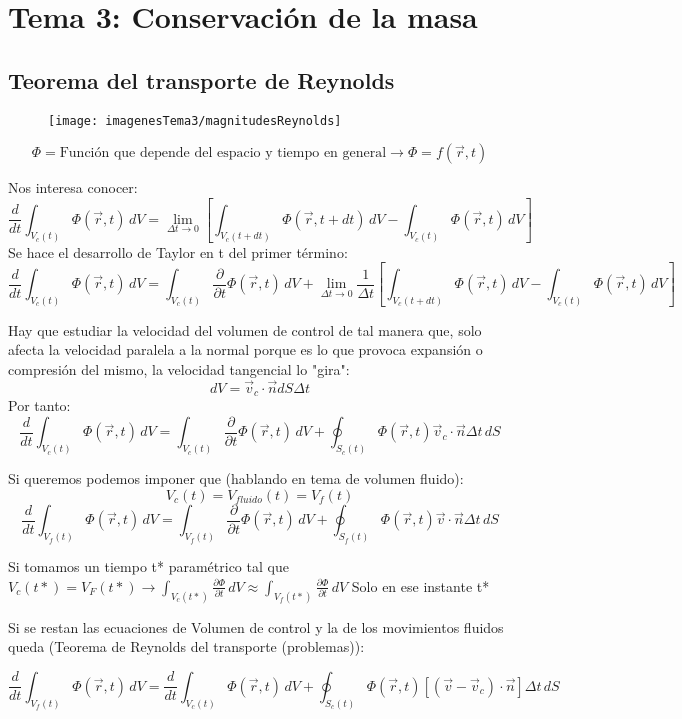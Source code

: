 \section{Tema 3: Conservación de la masa}
\subsection{Teorema del transporte de Reynolds}
\begin{figure}[H]
	\centering
	\texttt{[image: imagenesTema3/magnitudesReynolds]}
	\caption{}
	\label{fig:magnitudesreynolds}
\end{figure}

\[\Phi=\text{Función que depende del espacio y tiempo en general}\rightarrow\Phi=f(\vec{r},t)\]

Nos interesa conocer:
\[\frac{d}{dt}\int_{V_c(t)} \Phi(\vec{r},t) \,dV=\lim_{\Delta t \to 0} \left[\int_{V_c(t+dt)} \Phi(\vec{r},t+dt) \,dV-\int_{V_c(t)} \Phi(\vec{r},t) \,dV\right]\]
Se hace el desarrollo de Taylor en t del primer término:
\[\frac{d}{dt}\int_{V_c(t)} \Phi(\vec{r},t) \,dV=\int_{V_c(t)} \frac{\partial}{\partial t}\Phi(\vec{r},t) \,dV+\lim_{\Delta t \to 0} \frac{1}{\Delta t}\left[\int_{V_c(t+dt)} \Phi(\vec{r},t) \,dV-\int_{V_c(t)} \Phi(\vec{r},t) \,dV\right]\]

Hay que estudiar la velocidad del volumen de control de tal manera que, solo afecta la velocidad paralela a la normal porque es lo que provoca expansión o compresión del mismo, la velocidad tangencial lo "gira":
\[dV=\vec{v}_c\cdot\vec{n}dS\Delta t\]
Por tanto:
\[\frac{d}{dt}\int_{V_c(t)} \Phi(\vec{r},t) \,dV=\int_{V_c(t)} \frac{\partial}{\partial t}\Phi(\vec{r},t) \,dV+\oint_{S_c(t)} \Phi(\vec{r},t)\vec{v}_c\cdot\vec{n}\Delta t \,dS\]

Si queremos podemos imponer que (hablando en tema de volumen fluido):
\[V_c(t)=V_{fluido}(t)=V_f(t)\]
\[\frac{d}{dt}\int_{V_f(t)} \Phi(\vec{r},t) \,dV=\int_{V_f(t)} \frac{\partial}{\partial t}\Phi(\vec{r},t) \,dV+\oint_{S_f(t)} \Phi(\vec{r},t)\vec{v}\cdot\vec{n}\Delta t \,dS\]

Si tomamos un tiempo t* paramétrico tal que $V_c(t*)=V_F(t*) \rightarrow \int_{V_c(t*)}\frac{\partial \Phi}{\partial t}\,dV\approx \int_{V_f(t*)}\frac{\partial \Phi}{\partial t}\,dV$ Solo en ese instante t*

Si se restan las ecuaciones de Volumen de control y la de los movimientos fluidos queda (Teorema de Reynolds del transporte (problemas)):

\[\frac{d}{dt}\int_{V_f(t)}\Phi(\vec{r},t)\,dV=\frac{d}{dt}\int_{V_c(t)}\Phi(\vec{r},t)\,dV+\oint_{S_c(t)} \Phi(\vec{r},t)\left[(\vec{v}-\vec{v}_c)\cdot\vec{n}\right]\Delta t \,dS\]

